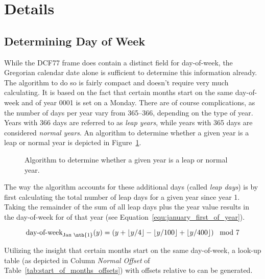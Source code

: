 \section{Details}

\subsection{Determining Day of Week}\label{sec:determining_day_of_week}

While the DCF77 frame does contain a distinct field for day-of-week, the Gregorian calendar date alone is sufficient to determine this information already. The algorithm to do so is fairly compact and doesn't require very much calculating. It is based on the fact that certain months start on the same day-of-week \cite{Mishra2016} and   of year 0001 is set on a Monday. There are of course complications, as the number of days per year vary from \numrange{365}{366}, depending on the type of year. Years with \num{366} days are referred to as \emph{leap years}, while years with \num{365} days are considered \emph{normal years}. An algorithm to determine whether a given year is a leap or normal year is depicted in Figure~\ref{fig:leap_year}.

\begin{figure}
    \centering
    \caption{Algorithm to determine whether a given year is a leap or normal year.}\label{fig:leap_year}
\end{figure}

The way the algorithm accounts for these additional days (called \emph{leap days}) is by first calculating the total number of leap days for a given year since year \num{1}. Taking the remainder of the sum of all leap days plus the year value results in the day-of-week for   of that year (see Equation~\ref{equ:january_first_of_year}).

\begin{equation}\label{equ:january_first_of_year}
    \text{day-of-week}_{\text{Jan \nth{1}}}(y) = \left(y + \lfloor y/4 \rfloor - \lfloor y/100 \rfloor + \lfloor y/400 \rfloor\right) \mod{7}
\end{equation}

Utilizing the insight that certain months start on the same day-of-week, a look-up table (as depicted in Column \emph{Normal Offset} of Table~\ref{tab:start_of_months_offsets}) with offsets relative to   can be generated.

